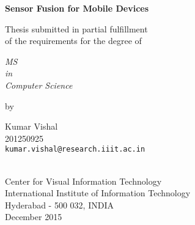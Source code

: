 \thispagestyle{empty}
\begin{center}
\vspace*{1.5cm}
{\Large \bf Sensor Fusion for Mobile Devices}

\vspace*{3.75cm}
{\large Thesis submitted in partial fulfillment\\}
{\large  of the requirements for the degree of \\}

\vspace*{1cm}
{\it {\large MS} \\
{\large in\\}
{\large Computer Science \\}}

\vspace*{1cm}
{\large by}

\vspace*{5mm}
{\large Kumar Vishal\\}
{\large 201250925\\
{\small \tt kumar.vishal@research.iiit.ac.in}}


\vspace*{4.0cm}
{\\}
{\large Center for Visual Information Technology \\}
{\large International Institute of Information Technology\\}
{\large Hyderabad - 500 032, INDIA\\}
{\large December 2015\\}
\end{center}